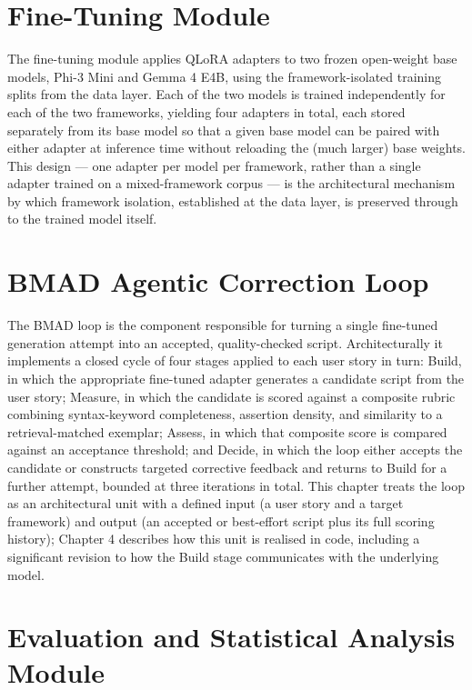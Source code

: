 \section{Fine-Tuning Module}

The fine-tuning module applies QLoRA adapters to two frozen open-weight
base models, Phi-3 Mini and Gemma 4 E4B, using the framework-isolated
training splits from the data layer. Each of the two models is trained
independently for each of the two frameworks, yielding four adapters in
total, each stored separately from its base model so that a given base
model can be paired with either adapter at inference time without
reloading the (much larger) base weights. This design --- one adapter
per model per framework, rather than a single adapter trained on a
mixed-framework corpus --- is the architectural mechanism by which
framework isolation, established at the data layer, is preserved through
to the trained model itself.

\section{BMAD Agentic Correction Loop}

The BMAD loop is the component responsible for turning a single
fine-tuned generation attempt into an accepted, quality-checked script.
Architecturally it implements a closed cycle of four stages applied to
each user story in turn: Build, in which the appropriate fine-tuned
adapter generates a candidate script from the user story; Measure, in
which the candidate is scored against a composite rubric combining
syntax-keyword completeness, assertion density, and similarity to a
retrieval-matched exemplar; Assess, in which that composite score is
compared against an acceptance threshold; and Decide, in which the loop
either accepts the candidate or constructs targeted corrective feedback
and returns to Build for a further attempt, bounded at three iterations
in total. This chapter treats the loop as an architectural unit with a
defined input (a user story and a target framework) and output (an
accepted or best-effort script plus its full scoring history); Chapter 4
describes how this unit is realised in code, including a significant
revision to how the Build stage communicates with the underlying model.

\section{Evaluation and Statistical Analysis Module}

